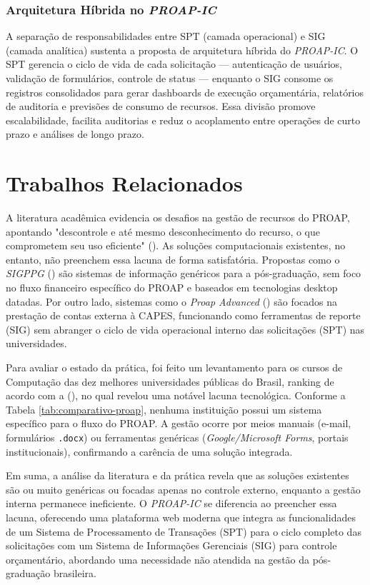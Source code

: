 \documentclass[portuguese]{sbc2025}%
\begin{document}
\subsubsection{Arquitetura Híbrida no \textit{PROAP-IC}}
A separação de responsabilidades entre SPT (camada operacional) e SIG (camada analítica) sustenta a proposta de arquitetura híbrida do \textit{PROAP-IC}. O SPT gerencia o ciclo de vida de cada solicitação — autenticação de usuários, validação de formulários, controle de status — enquanto o SIG consome os registros consolidados para gerar dashboards de execução orçamentária, relatórios de auditoria e previsões de consumo de recursos. Essa divisão promove escalabilidade, facilita auditorias e reduz o acoplamento entre operações de curto prazo e análises de longo prazo.

\section{Trabalhos Relacionados}

A literatura acadêmica evidencia os desafios na gestão de recursos do PROAP, apontando "descontrole e até mesmo desconhecimento do recurso, o que comprometem seu uso eficiente" (\cite{freitas2016analise, falquetto2018avaliacao, xavier2024utilizacao}). As soluções computacionais existentes, no entanto, não preenchem essa lacuna de forma satisfatória. Propostas como o \textit{SIGPPG} (\cite{padilha2013sigppg}) são sistemas de informação genéricos para a pós-graduação, sem foco no fluxo financeiro específico do PROAP e baseados em tecnologias desktop datadas. Por outro lado, sistemas como o \textit{Proap Advanced} (\cite{castro2005sistema}) são focados na prestação de contas externa à CAPES, funcionando como ferramentas de reporte (SIG) sem abranger o ciclo de vida operacional interno das solicitações (SPT) nas universidades.

Para avaliar o estado da prática, foi feito um levantamento para os cursos de Computação das dez melhores universidades públicas do Brasil, ranking de acordo com a (\cite{folha2024ruf}), no qual revelou uma notável lacuna tecnológica. Conforme a Tabela \ref{tab:comparativo-proap}, nenhuma instituição possui um sistema específico para o fluxo do PROAP. A gestão ocorre por meios manuais (e-mail, formulários \texttt{.docx}) ou ferramentas genéricas (\textit{Google/Microsoft Forms}, portais institucionais), confirmando a carência de uma solução integrada.

Em suma, a análise da literatura e da prática revela que as soluções existentes são ou muito genéricas ou focadas apenas no controle externo, enquanto a gestão interna permanece ineficiente. O \textit{PROAP-IC} se diferencia ao preencher essa lacuna, oferecendo uma plataforma web moderna que integra as funcionalidades de um Sistema de Processamento de Transações (SPT) para o ciclo completo das solicitações com um Sistema de Informações Gerenciais (SIG) para controle orçamentário, abordando uma necessidade não atendida na gestão da pós-graduação brasileira.
\end{document}
